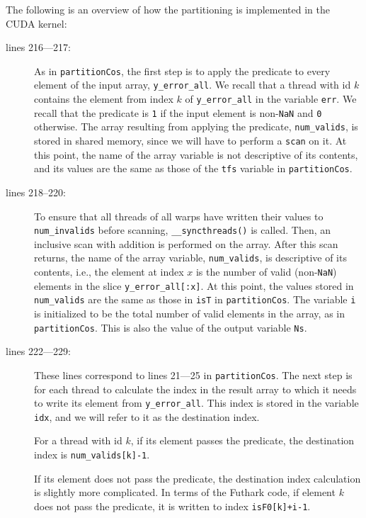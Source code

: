 The following is an overview of how the partitioning is implemented in the CUDA
kernel:
\begin{description}
  \item[lines 216---217:] %
    As in \texttt{partitionCos}, the first step is to apply the predicate to
    every element of the input array, \texttt{y\_error\_all}.
    We recall that a thread with id \(k\) contains the element from index
    \(k\) of \texttt{y\_error\_all} in the variable \texttt{err}.
    We recall that the predicate is \texttt{1} if the input element is
    non-\texttt{NaN} and \texttt{0} otherwise.
    The array resulting from applying the predicate, \texttt{num\_valids}, is
    stored in shared memory, since we will have to perform a \texttt{scan} on
    it.
    At this point, the name of the array variable is not descriptive of its
    contents, and its values are the same as those of the \texttt{tfs} variable
    in \texttt{partitionCos}.

  \item[lines 218--220:] %
    To ensure that all threads of all warps have written their values to
    \texttt{num\_invalids} before scanning, \texttt{\_\_syncthreads()} is
    called.
    Then, an inclusive scan with addition is performed on the array.
    After this scan returns, the name of the array variable,
    \texttt{num\_valids}, is descriptive of its contents, i.e., the element at
    index \(x\) is the number of valid (non-\texttt{NaN}) elements in the slice
    \texttt{y\_error\_all[:x]}.
    At this point, the values stored in \texttt{num\_valids} are the same as
    those in \texttt{isT} in \texttt{partitionCos}.
    The variable \texttt{i} is initialized to be the total number of valid
    elements in the array, as in \texttt{partitionCos}.
    This is also the value of the output variable \texttt{Ns}.

  \item[lines 222---229:] %
    These lines correspond to lines 21---25 in \texttt{partitionCos}.
    The next step is for each thread to calculate the index in the result array
    to which it needs to write its element from \texttt{y\_error\_all}.
    This index is stored in the variable \texttt{idx}, and we will refer to
    it as the destination index.

    For a thread with id \(k\), if its element passes the predicate, the
    destination index is \texttt{num\_valids[k]-1}.

    If its element does not pass the predicate, the destination index
    calculation is slightly more complicated.
    In terms of the Futhark code, if element \(k\) does not pass the predicate,
    it is written to index \texttt{isF0[k]+i-1}.


\end{description}
